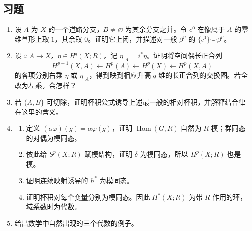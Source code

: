 \subsection*{习题}
\begin{enumerate}
\item 设 $A$ 为 $X$ 的一个道路分支，$B\ne\varnothing$ 为其余分支之并。令 $c^0$ 在像属于 $A$ 的零维单形上取 $1$，其余取 $0$。证明它上闭，并描述对一般 $\beta^p$ 的 $\{c^0\}\smile\beta^p$。
\item 设 $i:A\to X$，$\eta\in H^q(X;R)$，记 $\eta|_A=i^*\eta$。证明将空间偶长正合列
\[
H^{p+1}(X,A)\leftarrow H^p(A)\leftarrow H^p(X)\leftarrow H^p(X,A)
\]
的各项分别右乘 $\eta$ 或 $\eta|_A$，得到映到相应升高 $q$ 维的长正合列的交换图。若全改为左乘，会怎样？
\item 若 $\{A,B\}$ 可切除，证明杯积公式诱导上述最一般的相对杯积，并解释结合律在这里的含义。
\item \begin{enumerate}[label=(\alph*)]
\item 定义 $(\alpha\varphi)(g)=\alpha\varphi(g)$，证明 $\operatorname{Hom}(G,R)$ 自然为 $R$ 模；群同态的对偶为模同态。
\item 依此给 $S^p(X;R)$ 赋模结构，证明 $\delta$ 为模同态，所以 $H^p(X;R)$ 也是模。
\item 证明连续映射诱导的 $h^*$ 为模同态。
\item 证明杯积对每个变量分别为模同态。因此 $H^*(X;R)$ 为带 $R$ 作用的环，域系数时为代数。
\end{enumerate}
\item 给出数学中自然出现的三个代数的例子。
\end{enumerate}
